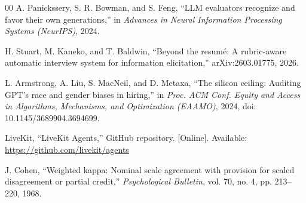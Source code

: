 \documentclass[conference]{IEEEtran}
\begin{document}
\begin{thebibliography}{00}
 A. Panickssery, S. R. Bowman, and S. Feng, ``LLM evaluators recognize and favor their own generations,'' in \textit{Advances in Neural Information Processing Systems (NeurIPS)}, 2024.

 H. Stuart, M. Kaneko, and T. Baldwin, ``Beyond the resum\'e: A rubric-aware automatic interview system for information elicitation,'' arXiv:2603.01775, 2026.

 L. Armstrong, A. Liu, S. MacNeil, and D. Metaxa, ``The silicon ceiling: Auditing GPT's race and gender biases in hiring,'' in \textit{Proc. ACM Conf. Equity and Access in Algorithms, Mechanisms, and Optimization (EAAMO)}, 2024, doi: 10.1145/3689904.3694699.

 LiveKit, ``LiveKit Agents,'' GitHub repository. [Online]. Available: \url{https://github.com/livekit/agents}

 J. Cohen, ``Weighted kappa: Nominal scale agreement with provision for scaled disagreement or partial credit,'' \textit{Psychological Bulletin}, vol. 70, no. 4, pp. 213--220, 1968.

\end{thebibliography}
\end{document}

